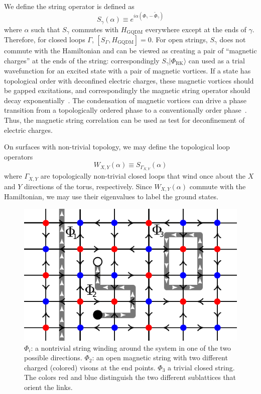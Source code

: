 \documentclass[twocolumn,prb,aps,floatfix,superscriptaddress]{revtex4-1}
\newcommand{\ket}[1]{| #1 \rangle}
\newcommand{\RK}{\mathrm{RK}}
\newcommand{\HGQDM}{H_\mathrm{GQDM}}
\begin{document}
We define the string operator is defined as
\begin{equation}
S_\gamma \left( \alpha \right) \equiv e^{i \alpha \left( \Phi_\gamma - \tilde{\Phi}_\gamma \right)} \label{eq:Sgamma}
\end{equation}
where $\alpha$ such that $S_\gamma$ commutes with $\HGQDM$ everywhere except at the ends of $\gamma$. Therefore, for closed loops $\Gamma$, $[ S_\Gamma,\HGQDM]=0$. For open strings, $S_\gamma$ does not commute with the Hamiltonian and can be viewed as creating a pair of ``magnetic charges'' at the ends of the string: correspondingly $S_\gamma \ket{\Phi_{\RK}}$ can used as a trial wavefunction for an excited state with a pair of magnetic vortices. If a state has topological order with deconfined electric charges, these magnetic vortices should be gapped excitations, and correspondingly the magnetic string operator should decay exponentially~\cite{Read1989a,Senthil2000,Senthil2001e}. The condensation of magnetic vortices can drive a phase transition from a topologically ordered phase to a conventionally order phase~\cite{Jalabert1991,Ralko2007}. Thus, the magnetic string correlation can be used as test for deconfinement of electric charges.

On surfaces with non-trivial topology, we may define the topological loop operators
\begin{equation}
W_{X,Y} \left( \alpha \right) \equiv S_{\Gamma_{X,Y}} \left( \alpha \right)
\end{equation}
where $\Gamma_{X,Y}$ are topologically non-trivial closed loops that wind once about the $X$ and $Y$ directions of the torus, respectively. Since $W_{X,Y} (\alpha)$ commute with the Hamiltonian, we may use their eigenvalues to label the ground states.

\begin{figure}[tpb]
    \centering
    \includegraphics[width=1.0\columnwidth]{mag_loops_on_orntd_lat.pdf}
    \caption{$\Phi_i$: a nontrivial string winding around the system in one of the two possible
        directions. $\Phi_2$: an open
    magnetic string with two different charged (colored) visons at the end points. $\Phi_3$ a trivial closed
    string. The colors red and blue distinguish the two different sublattices that orient the links.}
    \label{fig:orientedSL}
\end{figure}
\end{document}
